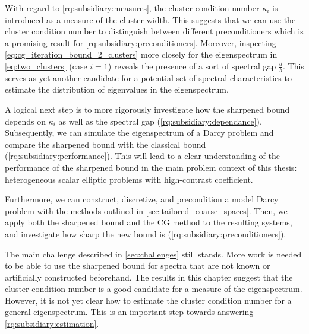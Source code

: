 With regard to \ref{rq:subsidiary:measures}, the cluster condition number $\kappa_i$ is introduced as a measure of the cluster width. This suggests that we can use the cluster condition number to distinguish between different preconditioners which is a promising result for \ref{rq:subsidiary:preconditioners}. Moreover, inspecting \cref{eq:cg_iteration_bound_2_clusters} more closely for the eigenspectrum in \cref{eq:two_clusters} (case $i=1$) reveals the presence of a sort of spectral gap $\frac{d}{b}$. This serves as yet another candidate for a potential set of spectral characteristics to estimate the distribution of eigenvalues in the eigenspectrum.

A logical next step is to more rigorously investigate how the sharpened bound depends on $\kappa_i$ as well as the spectral gap (\ref{rq:subsidiary:dependance}). Subsequently, we can simulate the eigenspectrum of a Darcy problem and compare the sharpened bound with the classical bound (\ref{rq:subsidiary:performance}). This will lead to a clear understanding of the performance of the sharpened bound in the main problem context of this thesis: heterogeneous scalar elliptic problems with high-contrast coefficient.

Furthermore, we can construct, discretize, and precondition a model Darcy problem with the methods outlined in \cref{sec:tailored_coarse_spaces}. Then, we apply both the sharpened bound and the CG method to the resulting systems, and investigate how sharp the new bound is (\ref{rq:subsidiary:preconditioners}).

The main challenge described in \cref{sec:challenges} still stands. More work is needed to be able to use the sharpened bound for spectra that are not known or artificially constructed beforehand. The results in this chapter suggest that the cluster condition number is a good candidate for a measure of the eigenspectrum. However, it is not yet clear how to estimate the cluster condition number for a general eigenspectrum. This is an important step towards answering \ref{rq:subsidiary:estimation}.